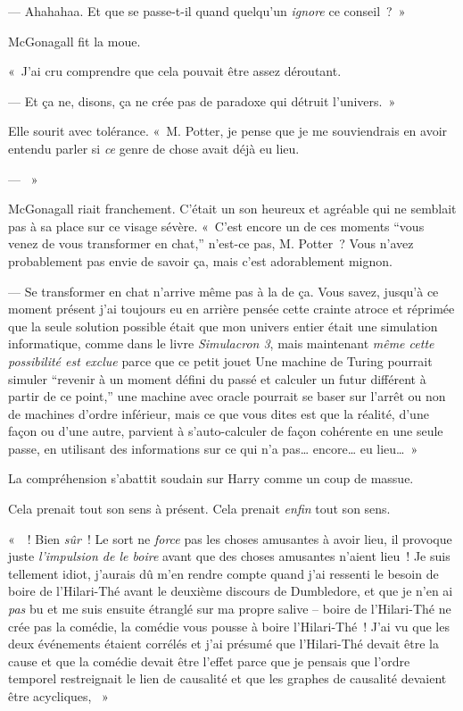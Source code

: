 --- Ahahahaa. Et que se passe-t-il quand quelqu'un \emph{ignore} ce conseil~?~»

McGonagall fit la moue.

«~J'ai cru comprendre que cela pouvait être assez déroutant.

--- Et ça ne, disons, ça ne crée pas de paradoxe qui détruit l'univers.~»

Elle sourit avec tolérance.
«~M. Potter, je pense que je me souviendrais en avoir entendu parler si \emph{ce} genre de chose avait déjà eu lieu.

--- ~»

McGonagall riait franchement.
C'était un son heureux et agréable qui ne semblait pas à sa place sur ce visage sévère.
«~C'est encore un de ces moments “vous venez de vous transformer en chat,” n'est-ce pas, M. Potter~?
Vous n'avez probablement pas envie de savoir ça, mais c'est adorablement mignon.

--- Se transformer en chat n'arrive même pas à la  de ça.
Vous savez, jusqu'à ce moment présent j'ai toujours eu en arrière pensée cette crainte atroce et réprimée que la seule solution possible était que mon univers entier était une simulation informatique, comme dans le livre \emph{Simulacron 3}, mais maintenant \emph{même cette possibilité est exclue} parce que ce petit jouet 
Une machine de Turing pourrait simuler “revenir à un moment défini du passé et calculer un futur différent à partir de ce point,” une machine avec oracle pourrait se baser sur l'arrêt ou non de machines d'ordre inférieur, mais ce que vous dites est que la réalité, d'une façon ou d'une autre, parvient à s'auto-calculer de façon cohérente en une seule passe, en utilisant des informations sur ce qui n'a pas… encore… eu lieu…~»

La compréhension s'abattit soudain sur Harry comme un coup de massue.

Cela prenait tout son sens à présent. Cela prenait \emph{enfin} tout son sens.

«~~!
Bien \emph{sûr}~!
Le sort ne \emph{force} pas les choses amusantes à avoir lieu, il provoque juste \emph{l'impulsion de le boire} avant que des choses amusantes n'aient lieu~!
Je suis tellement idiot, j'aurais dû m'en rendre compte quand j'ai ressenti le besoin de boire de l'Hilari-Thé avant le deuxième discours de Dumbledore, et que je n'en ai \emph{pas} bu et me suis ensuite étranglé sur ma propre salive -- boire de l'Hilari-Thé ne crée pas la comédie, la comédie vous pousse à boire l'Hilari-Thé~!
J'ai vu que les deux événements étaient corrélés et j'ai présumé que l'Hilari-Thé devait être la cause et que la comédie devait être l'effet parce que je pensais que l'ordre temporel restreignait le lien de causalité et que les graphes de causalité devaient être acycliques, ~»

